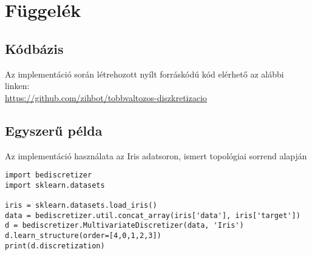 \appendix \label{chapter:függelék}
\chapter*{Függelék}
\setcounter{chapter}{6}  %
\setcounter{equation}{0} %




\section{Kódbázis} \label{appendix:codebase}
Az implementáció során létrehozott nyílt forráskódú kód elérhető az alábbi linken: \\ \url{https://github.com/zihbot/tobbvaltozos-diszkretizacio}

\section{Egyszerű példa} \label{appendix:simpleexample}
Az implementáció használata az Iris adatsoron, ismert topológiai sorrend alapján
\begin{lstlisting}
import bediscretizer
import sklearn.datasets

iris = sklearn.datasets.load_iris()
data = bediscretizer.util.concat_array(iris['data'], iris['target'])
d = bediscretizer.MultivariateDiscretizer(data, 'Iris')
d.learn_structure(order=[4,0,1,2,3])
print(d.discretization)
\end{lstlisting}